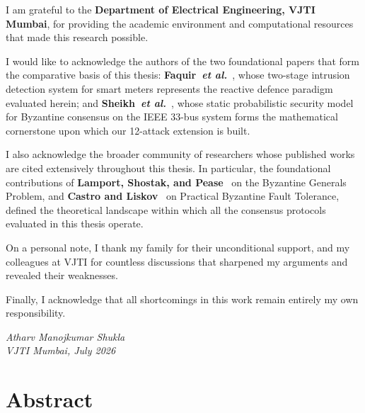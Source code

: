 \documentclass[12pt, oneside, a4paper]{report}
\theoremstyle{definition}
\theoremstyle{remark}
\begin{document}
\medskip

I am grateful to the \textbf{Department of Electrical Engineering, VJTI Mumbai}, for providing the academic environment and computational resources that made this research possible.

\medskip

I would like to acknowledge the authors of the two foundational papers that form the comparative basis of this thesis: \textbf{Faquir~\emph{et al.}}~\cite{ids_smart_meter}, whose two-stage intrusion detection system for smart meters represents the reactive defence paradigm evaluated herein; and \textbf{Sheikh~\emph{et al.}}~\cite{sheikh2020}, whose static probabilistic security model for Byzantine consensus on the IEEE 33-bus system forms the mathematical cornerstone upon which our 12-attack extension is built.

\medskip

I also acknowledge the broader community of researchers whose published works are cited extensively throughout this thesis. In particular, the foundational contributions of \textbf{Lamport, Shostak, and Pease}~\cite{lamport1982} on the Byzantine Generals Problem, and \textbf{Castro and Liskov}~\cite{castro1999} on Practical Byzantine Fault Tolerance, defined the theoretical landscape within which all the consensus protocols evaluated in this thesis operate.

\medskip

On a personal note, I thank my family for their unconditional support, and my colleagues at VJTI for countless discussions that sharpened my arguments and revealed their weaknesses.

\medskip

Finally, I acknowledge that all shortcomings in this work remain entirely my own responsibility.

\bigskip

\begin{flushright}
  \textit{Atharv Manojkumar Shukla}\\
  \textit{VJTI Mumbai, July 2026}
\end{flushright}


\cleardoublepage


\chapter*{Abstract}
\end{document}

